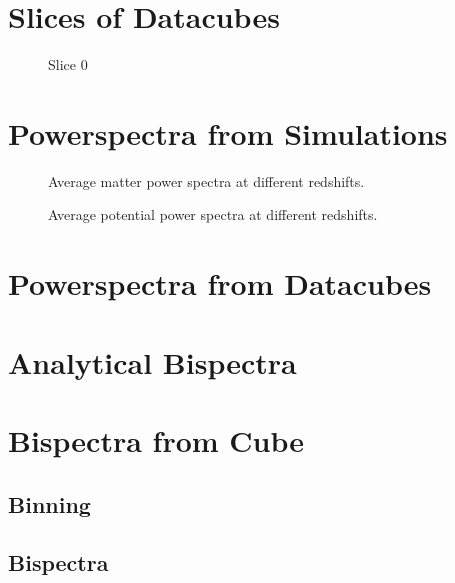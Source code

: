 %
%

\section{Slices of Datacubes}

  \begin{figure}
    \centering
    \caption{Slice 0}
  \end{figure}

\section{Powerspectra from Simulations}

  \begin{figure}
      \centering
      \caption{Average matter power spectra at different redshifts.}
    \end{figure}

    \begin{figure}
      \centering
      \caption{Average potential power spectra at different redshifts.}
    \end{figure}

\section{Powerspectra from Datacubes}

\section{Analytical Bispectra}

  


  \begin{figure}
    \centering
  \end{figure}

\section{Bispectra from Cube}
  \subsection{Binning}

    \begin{figure}
      \centering
    \end{figure}

  \subsection{Bispectra}
    \begin{figure}
      \centering
    \end{figure}


